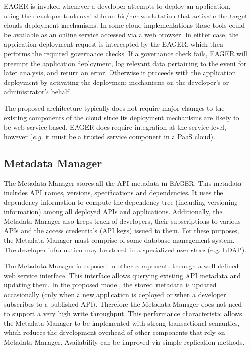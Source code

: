 EAGER is invoked whenever a developer attempts to deploy an application, using
the developer tools available on his/her workstation that activate the target
clouds deployment mechanisms. In some cloud
implementations these tools could be available as an online service accessed
via a web browser. In either case, the application deployment request is
intercepted by the EAGER, which then performs the required governance checks.
If a governance check fails, EAGER will preempt the application deployment,
log relevant data pertaining to the event for later analysis,  and
return an error. Otherwise it proceeds with the application deployment by
activating the deployment mechanisms on the developer's or administrator's
behalf.

The proposed architecture typically does not require major changes to the 
existing components of the cloud since its deployment mechanisms are likely to
be web service based.  EAGER does require integration at the service level,
however ({\em e.g.} it must be a trusted service component in a PaaS cloud). 

\subsection{Metadata Manager}
The Metadata Manager stores all the API metadata in EAGER. This metadata 
includes API names, versions, specifications and dependencies.
It uses the dependency information to compute the dependency tree (including
versioning information)
among 
all deployed APIs and applications. Additionally, the Metadata Manager
also keeps track of developers, their subscriptions to various APIs and the access credentials (API keys) issued to them. For these purposes,
the Metadata Manager must comprise of some database management system. The developer information may be stored in a specialized user
store (e.g. LDAP).

The Metadata Manager is exposed to other components through a well defined web service interface.
This interface allows querying existing API metadata and updating them. In the proposed model, the stored metadata is updated 
occasionally (only when a new application is deployed or when a developer subscribes to a published API). Therefore the Metadata Manager
does not need to support a very high write throughput. This performance
characteristic allows the Metadata Manager to be implemented with strong 
transactional semantics,
which reduces the development overhead of other components that rely on Metadata Manager. Availability can be improved via
simple replication methods.

